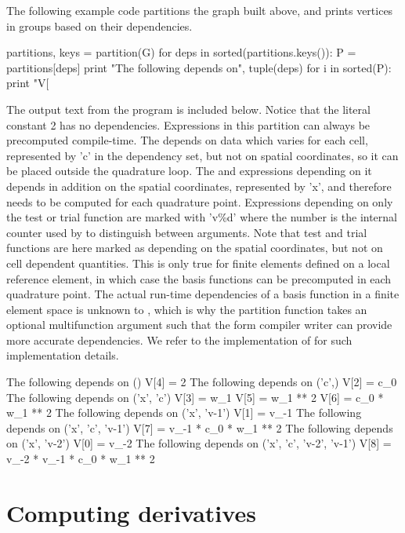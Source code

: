 The following example code partitions the graph built above, and prints
vertices in groups based on their dependencies.
\begin{python}
partitions, keys = partition(G)
for deps in sorted(partitions.keys()):
    P = partitions[deps]
    print "The following depends on", tuple(deps)
    for i in sorted(P):
        print "V[%
\end{python}
The output text from the program is included below.  Notice that the
literal constant 2 has no dependencies. Expressions in this partition can
always be precomputed compile-time. The   depends
on data which varies for each cell, represented by 'c' in the dependency
set, but not on spatial coordinates, so it can be placed outside the
quadrature loop. The   and expressions depending
on it depends in addition on the spatial coordinates, represented by
'x', and therefore needs to be computed for each quadrature point.
Expressions depending on only the test or trial function are marked
with 'v\%d' where the number is the internal counter used by \ufl{} to
distinguish between arguments.  Note that test and trial functions are
here marked as depending on the spatial coordinates, but not on cell
dependent quantities. This is only true for finite elements defined
on a local reference element, in which case the basis functions can be
precomputed in each quadrature point.  The actual run-time dependencies
of a basis function in a finite element space is unknown to \ufl{},
which is why the partition function takes an optional multifunction
argument such that the form compiler writer can provide more accurate
dependencies. We refer to the implementation of  for such
implementation details.
\begin{gencode}
The following depends on ()
V[4] = 2
The following depends on ('c',)
V[2] = c_0
The following depends on ('x', 'c')
V[3] = w_1
V[5] = w_1 ** 2
V[6] = c_0 * w_1 ** 2
The following depends on ('x', 'v-1')
V[1] = v_{-1}
The following depends on ('x', 'c', 'v-1')
V[7] = v_{-1} * c_0 * w_1 ** 2
The following depends on ('x', 'v-2')
V[0] = v_{-2}
The following depends on ('x', 'c', 'v-2', 'v-1')
V[8] = v_{-2} * v_{-1} * c_0 * w_1 ** 2
\end{gencode}

\section{Computing derivatives} \label{ufl:sec:ad}

